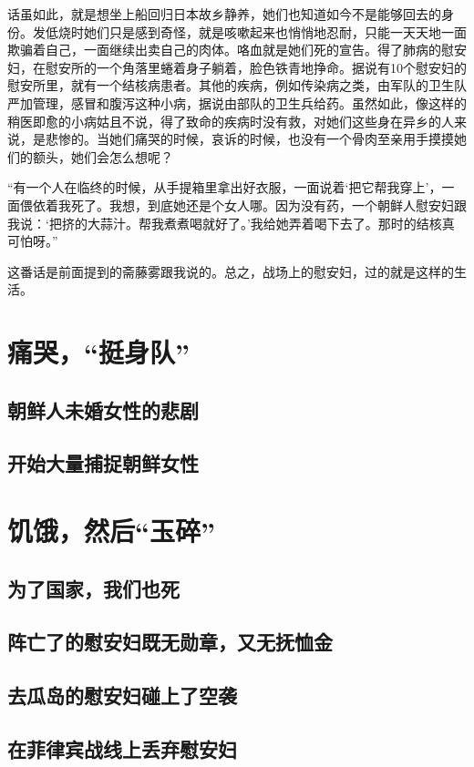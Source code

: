 \documentclass[12pt,UTF8]{ctexbook}
\begin{document}
话虽如此，就是想坐上船回归日本故乡静养，她们也知道如今不是能够回去的身份。发低烧时她们只是感到奇怪，就是咳嗽起来也悄悄地忍耐，只能一天天地一面欺骗着自己，一面继续出卖自己的肉体。咯血就是她们死的宣告。得了肺病的慰安妇，在慰安所的一个角落里蜷着身子躺着，脸色铁青地挣命。据说有10个慰安妇的慰安所里，就有一个结核病患者。其他的疾病，例如传染病之类，由军队的卫生队严加管理，感冒和腹泻这种小病，据说由部队的卫生兵给药。虽然如此，像这样的稍医即愈的小病姑且不说，得了致命的疾病时没有救，对她们这些身在异乡的人来说，是悲惨的。当她们痛哭的时候，哀诉的时候，也没有一个骨肉至亲用手摸摸她们的额头，她们会怎么想呢？

“有一个人在临终的时候，从手提箱里拿出好衣服，一面说着‘把它帮我穿上’，一面偎依着我死了。我想，到底她还是个女人哪。因为没有药，一个朝鲜人慰安妇跟我说：‘把挤的大蒜汁。帮我煮煮喝就好了。’我给她弄着喝下去了。那时的结核真可怕呀。”

这番话是前面提到的斋藤雾跟我说的。总之，战场上的慰安妇，过的就是这样的生活。

\chapter{痛哭，“挺身队”}

\section{朝鲜人未婚女性的悲剧}

\section{开始大量捕捉朝鲜女性}

\chapter{饥饿，然后“玉碎”}

\section{为了国家，我们也死}
\section{阵亡了的慰安妇既无勋章，又无抚恤金}
\section{去瓜岛的慰安妇碰上了空袭}
\section{在菲律宾战线上丢弃慰安妇}
\end{document}
